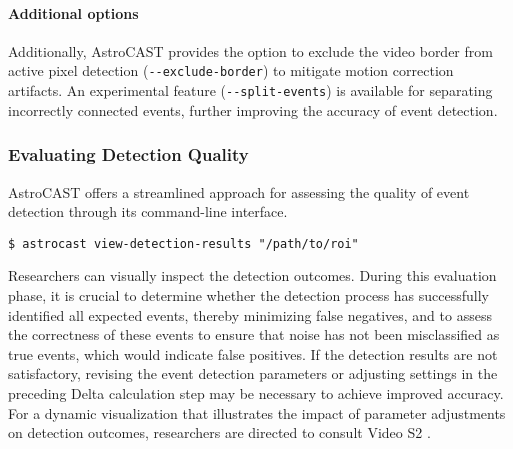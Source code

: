 \paragraph{Additional options}
Additionally, AstroCAST provides the option to exclude the video border from active pixel detection (\lstinline[style=bashStyle]{--exclude-border}) to mitigate motion correction artifacts. An experimental feature (\lstinline[style=bashStyle]{--split-events}) is available for separating incorrectly connected events, further improving the accuracy of event detection.


\subsubsection{Evaluating Detection Quality}
AstroCAST offers a streamlined approach for assessing the quality of event detection through its command-line interface.

\begin{lstlisting}[style=bashStyle]
    $ astrocast view-detection-results "/path/to/roi"
\end{lstlisting}

Researchers can visually inspect the detection outcomes. During this evaluation phase, it is crucial to determine
whether the detection process has successfully identified all expected events, thereby minimizing false negatives,
and to assess the correctness of these events to ensure that noise has not been misclassified as true events, which
would indicate false positives. If the detection results are not satisfactory, revising the event detection
parameters or adjusting settings in the preceding Delta calculation step may be necessary to achieve improved
accuracy. For a dynamic visualization that illustrates the impact of parameter adjustments on detection outcomes,
researchers are directed to consult Video S2 .
